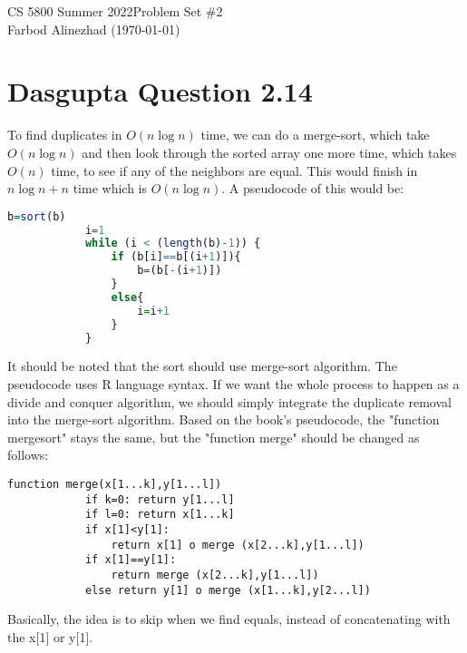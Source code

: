 

    CS 5800 Summer 2022\hfill Problem Set \#2\\
    Farbod Alinezhad (\today)

    \hrulefill

    \tableofcontents
    \newpage


    \section{Dasgupta Question 2.14}\label{sec:question-2.14}
    To find duplicates in $O(n\log{n})$ time, we can do a merge-sort, which take $O(n \log n)$ and then
    look through the sorted array one more time, which takes $O(n)$ time, to see if any of the neighbors are
    equal. This would finish in $n\log{n}+n$ time which is $O(n\log{n})$.
    A pseudocode of this would be:
    \begin{lstlisting}[language=R,label={lst:lstlisting}]
            b=sort(b)
            i=1
            while (i < (length(b)-1)) {
                if (b[i]==b[(i+1)]){
                    b=(b[-(i+1)])
                }
                else{
                    i=i+1
                }
            }
    \end{lstlisting}

    It should be noted that the sort should use merge-sort algorithm. The pseudocode uses R language syntax.\newline
    If we want the whole process to happen as a divide and conquer algorithm, we should simply integrate the
    duplicate removal into the merge-sort algorithm. Based on the book's pseudocode, the "function mergesort"
    stays the same, but the "function merge" should be changed as follows:
    \begin{lstlisting}[label=lst:mergesort_duplicateless]
            function merge(x[1...k],y[1...l])
            if k=0: return y[1...l]
            if l=0: return x[1...k]
            if x[1]<y[1]:
                return x[1] o merge (x[2...k],y[1...l])
            if x[1]==y[1]:
                return merge (x[2...k],y[1...l])
            else return y[1] o merge (x[1...k],y[2...l])
    \end{lstlisting}
    Basically, the idea is to skip when we find equals, instead of concatenating with the x[1] or y[1].
    \newpage


